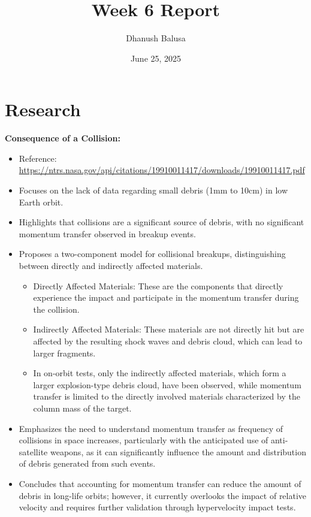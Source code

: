 \documentclass[12pt]{report}
\title{Week 6 Report}
\author{Dhanush Balusa}
\date{June 25, 2025}
\begin{document}
\maketitle

\chapter*{Research}

\noindent \textbf{Consequence of a Collision:}
\begin{itemize}
  \item Reference: \url{https://ntrs.nasa.gov/api/citations/19910011417/downloads/19910011417.pdf}
  \item Focuses on the lack of data regarding small debris (1mm to 10cm) in low Earth orbit.
  \item Highlights that collisions are a significant source of debris, with no significant momentum transfer observed in breakup events.
  \item Proposes a two-component model for collisional breakups, distinguishing between directly and indirectly affected materials.
  \begin{itemize}
    \item Directly Affected Materials: These are the components that directly experience the impact and participate in the momentum transfer during the collision.
    \item Indirectly Affected Materials: These materials are not directly hit but are affected by the resulting shock waves and debris cloud, which can lead to larger fragments.
    \item In on-orbit tests, only the indirectly affected materials, which form a larger explosion-type debris cloud, have been observed, while momentum transfer is limited to the directly involved materials characterized by the column mass of the target.
  \end{itemize}
  \item Emphasizes the need to understand momentum transfer as frequency of collisions in space increases, particularly with the anticipated use of anti-satellite weapons, as it can significantly influence the amount and distribution of debris generated from such events.
  \item Concludes that accounting for momentum transfer can reduce the amount of debris in long-life orbits; however, it currently overlooks the impact of relative velocity and requires further validation through hypervelocity impact tests.
\end{itemize}
\end{document}
